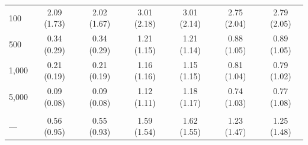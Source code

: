 \documentclass[AMA,STIX1COL,doublespace]{WileyNJD-v2}
\begin{document}
\begin{table}
\begin{tabular}[t]{lcccccc}
\hline
\hspace{1em}100 & 2.09 (1.73) & 2.02 (1.67) & 3.01 (2.18) & 3.01 (2.14) & 2.75 (2.04) & 2.79 (2.05)\\
\hspace{1em}500 & 0.34 (0.29) & 0.34 (0.29) & 1.21 (1.15) & 1.21 (1.14) & 0.88 (1.05) & 0.89 (1.05)\\
\hspace{1em}1,000 & 0.21 (0.19) & 0.21 (0.19) & 1.16 (1.16) & 1.15 (1.15) & 0.81 (1.04) & 0.79 (1.02)\\
\hspace{1em}5,000 & 0.09 (0.08) & 0.09 (0.08) & 1.12 (1.11) & 1.18 (1.17) & 0.74 (1.03) & 0.77 (1.08)\\
\addlinespace[0.75em]
\multicolumn{7}{l}{\textbf{Overall}}\\
\hline
\hspace{1em}--- & 0.56 (0.95) & 0.55 (0.93) & 1.59 (1.54) & 1.62 (1.55) & 1.23 (1.47) & 1.25 (1.48)\\
\bottomrule
\end{tabular}
\end{table}
\end{document}
